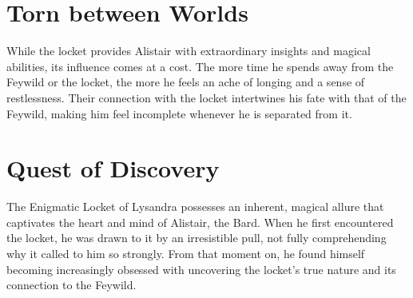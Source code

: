 \section*{Torn between Worlds}
While the locket provides Alistair with extraordinary insights and magical abilities, its influence comes at a cost. The more time he spends away from the Feywild or the locket, the more he feels an ache of longing and a sense of restlessness. Their connection with the locket intertwines his fate with that of the Feywild, making him feel incomplete whenever he is separated from it.
\section*{Quest of Discovery}
The Enigmatic Locket of Lysandra possesses an inherent, magical allure that captivates the heart and mind of Alistair, the Bard. When he first encountered the locket, he was drawn to it by an irresistible pull, not fully comprehending why it called to him so strongly. From that moment on, he found himself becoming increasingly obsessed with uncovering the locket's true nature and its connection to the Feywild.